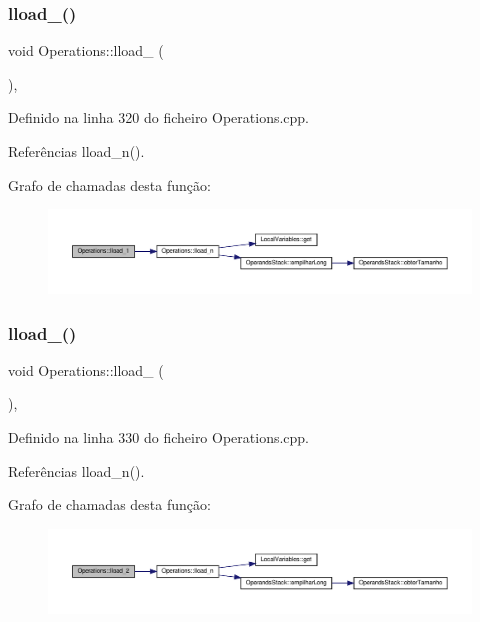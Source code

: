 \subsubsection{\texorpdfstring{lload\+\_()}{lload\_1()}}
{\footnotesize\ttfamily void Operations\+::lload\+\_ (\begin{DoxyParamCaption}{ }\end{DoxyParamCaption})\hspace{0.3cm}{\ttfamily [static]}, {\ttfamily [private]}}



Definido na linha 320 do ficheiro Operations.\+cpp.



Referências lload\+\_\+n().

Grafo de chamadas desta função\+:\nopagebreak
\begin{figure}[H]
\begin{center}
\leavevmode
\includegraphics[width=350pt]{classOperations_a34e91f6520ca574abce6b2b30ce91948_cgraph}
\end{center}
\end{figure}
\mbox{\label{classOperations_aa59772a5ed2bd59de3d54c635f294e93}} 
\subsubsection{\texorpdfstring{lload\+\_()}{lload\_2()}}
{\footnotesize\ttfamily void Operations\+::lload\+\_ (\begin{DoxyParamCaption}{ }\end{DoxyParamCaption})\hspace{0.3cm}{\ttfamily [static]}, {\ttfamily [private]}}



Definido na linha 330 do ficheiro Operations.\+cpp.



Referências lload\+\_\+n().

Grafo de chamadas desta função\+:\nopagebreak
\begin{figure}[H]
\begin{center}
\leavevmode
\includegraphics[width=350pt]{classOperations_aa59772a5ed2bd59de3d54c635f294e93_cgraph}
\end{center}
\end{figure}
\mbox{\label{classOperations_af2f8b1e41b734f43e73d9d6811eb427b}} 

